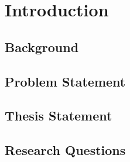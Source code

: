 \chapter{Introduction}\label{chap:intro}

\section{Background}\label{sec:background}

\section{Problem Statement}\label{sec:problem-statement}

\section{Thesis Statement}\label{sec:thesis-statement}

\section{Research Questions}\label{sec:research-questions}

